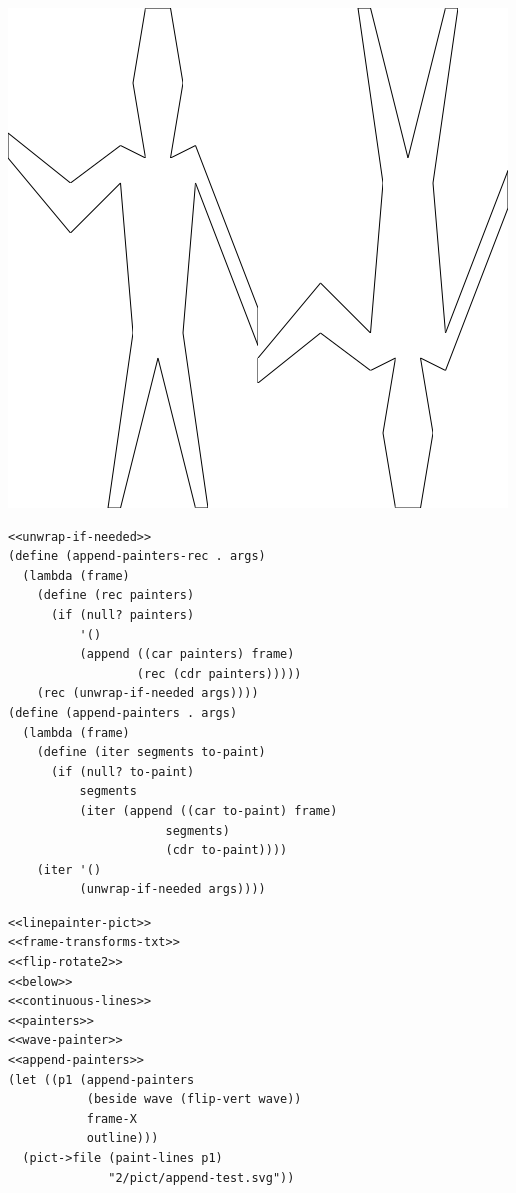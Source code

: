 \documentclass[final,fleqn,titlepage,twoside]{article}
\begin{document}
\begin{center}
\includegraphics[width=.9\linewidth]{2/pict/wave-test.png}
\end{center}

\begin{verbatim}
<<unwrap-if-needed>>
(define (append-painters-rec . args)
  (lambda (frame)
    (define (rec painters)
      (if (null? painters)
          '()
          (append ((car painters) frame)
                  (rec (cdr painters)))))
    (rec (unwrap-if-needed args))))
(define (append-painters . args)
  (lambda (frame)
    (define (iter segments to-paint)
      (if (null? to-paint)
          segments
          (iter (append ((car to-paint) frame)
                      segments)
                      (cdr to-paint))))
    (iter '()
          (unwrap-if-needed args))))
\end{verbatim}
\begin{verbatim}
<<linepainter-pict>>
<<frame-transforms-txt>>
<<flip-rotate2>>
<<below>>
<<continuous-lines>>
<<painters>>
<<wave-painter>>
<<append-painters>>
(let ((p1 (append-painters
           (beside wave (flip-vert wave))
           frame-X
           outline)))
  (pict->file (paint-lines p1)
              "2/pict/append-test.svg"))
\end{verbatim}
\end{document}
